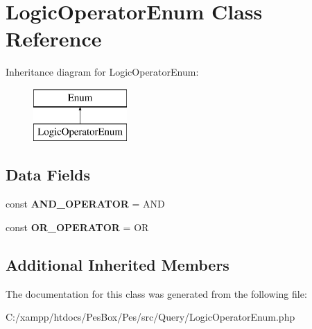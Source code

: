 \hypertarget{class_pes_1_1_query_1_1_logic_operator_enum}{}\section{Logic\+Operator\+Enum Class Reference}
\label{class_pes_1_1_query_1_1_logic_operator_enum}
Inheritance diagram for Logic\+Operator\+Enum\+:\begin{figure}[H]
\begin{center}
\leavevmode
\includegraphics[height=2.000000cm]{class_pes_1_1_query_1_1_logic_operator_enum}
\end{center}
\end{figure}
\subsection*{Data Fields}
\begin{DoxyCompactItemize}
\item 
\mbox{\label{class_pes_1_1_query_1_1_logic_operator_enum_a70da72aae95b0d8182c93e046daf78ca}} 
const {\bfseries A\+N\+D\+\_\+\+O\+P\+E\+R\+A\+T\+OR} = \textquotesingle{}A\+ND\textquotesingle{}
\item 
\mbox{\label{class_pes_1_1_query_1_1_logic_operator_enum_a99217e7e3174a72a9d59298e183d78de}} 
const {\bfseries O\+R\+\_\+\+O\+P\+E\+R\+A\+T\+OR} = \textquotesingle{}OR\textquotesingle{}
\end{DoxyCompactItemize}
\subsection*{Additional Inherited Members}


The documentation for this class was generated from the following file\+:\begin{DoxyCompactItemize}
\item 
C\+:/xampp/htdocs/\+Pes\+Box/\+Pes/src/\+Query/Logic\+Operator\+Enum.\+php\end{DoxyCompactItemize}
